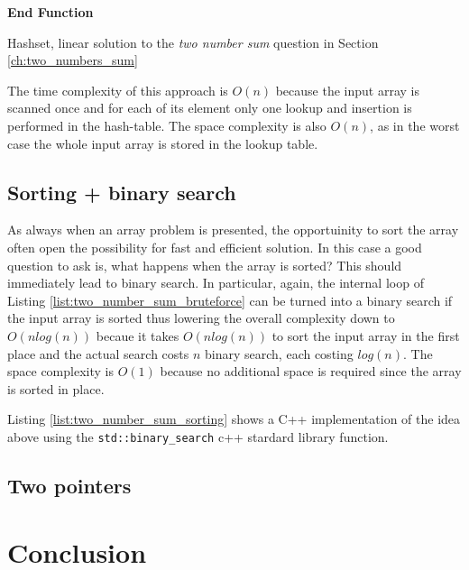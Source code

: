\begin{algorithm}
	
	\textbf{End Function}
	\label{algo:two_numbers_sum_hashset_wrong}
	\caption{Hashset, linear solution to the \textit{two number sum} question in Section \ref{ch:two_numbers_sum} }
\end{algorithm}

The time complexity of this approach is $O(n)$ because the input array is scanned once and for each of its element only one lookup and insertion is performed in the hash-table.  The space complexity is also $O(n)$, as in the worst case the whole input array is stored in the lookup table.

\subsection{Sorting + binary search}
As always when an array problem is presented, the opportuinity to sort the array often open the possibility for fast and efficient solution. 
In this case a good question to ask is, what happens when the array is sorted? This should immediately lead to binary search. In particular, again, the internal loop of Listing \ref{list:two_number_sum_bruteforce} can be turned into a binary search if the input array is sorted thus lowering the overall complexity down to $O(n log(n))$ becaue it takes $O(n log(n))$ to sort the input array in the first place and the actual search costs $n$ binary search, each costing $log(n)$.
The space complexity is $O(1)$ because no additional space is required since the array is sorted in place. 

Listing \ref{list:two_number_sum_sorting} shows a C++ implementation of the idea above using the \texttt{std::binary_search} c++ stardard library function.





\subsection{Two pointers}


\section{Conclusion}
